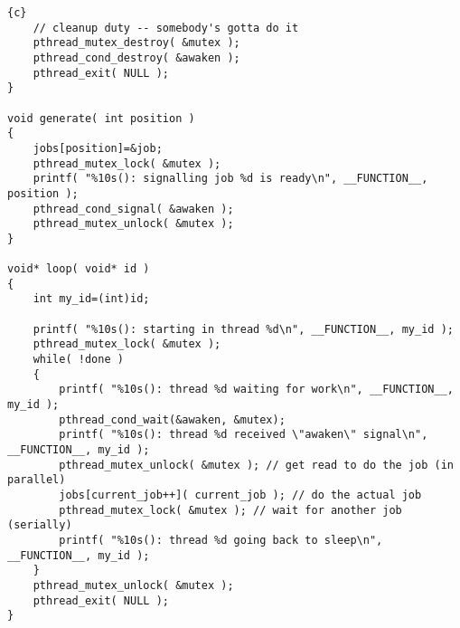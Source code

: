 \documentclass[10pt,a4paper]{scrartcl}
\begin{document}
\begin{lstlisting}{c}
	// cleanup duty -- somebody's gotta do it
	pthread_mutex_destroy( &mutex );
	pthread_cond_destroy( &awaken );
	pthread_exit( NULL );
}

void generate( int position )
{
	jobs[position]=&job;
	pthread_mutex_lock( &mutex );
	printf( "%10s(): signalling job %d is ready\n", __FUNCTION__, position );
	pthread_cond_signal( &awaken );
	pthread_mutex_unlock( &mutex );
}

void* loop( void* id ) 
{
	int my_id=(int)id;

	printf( "%10s(): starting in thread %d\n", __FUNCTION__, my_id );
	pthread_mutex_lock( &mutex );
	while( !done )
	{
		printf( "%10s(): thread %d waiting for work\n", __FUNCTION__, my_id );
		pthread_cond_wait(&awaken, &mutex);
		printf( "%10s(): thread %d received \"awaken\" signal\n", __FUNCTION__, my_id );
		pthread_mutex_unlock( &mutex ); // get read to do the job (in parallel)
		jobs[current_job++]( current_job ); // do the actual job
		pthread_mutex_lock( &mutex ); // wait for another job (serially)
		printf( "%10s(): thread %d going back to sleep\n", __FUNCTION__, my_id );
	}
	pthread_mutex_unlock( &mutex );
	pthread_exit( NULL );
}


\end{lstlisting}
\end{document}
